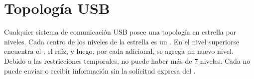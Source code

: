   \section{Topología USB}
  Cualquier sistema de comunicación USB posee una topología en estrella por
  niveles. Cada centro de los niveles de la estrella es un \hub.
  En el nivel superiorse encuentra el \host%
  , el \hub raíz, y luego, por cada \hub adicional, se agrega un nuevo nivel.
  Debido a las restricciones temporales, no puede haber más de 7 niveles.
  Cada \device no puede enviar o recibir información sin la solicitud expresa
  del \host.

